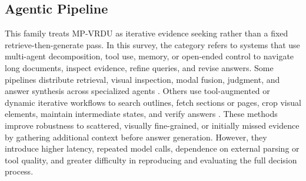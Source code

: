 \documentclass[11pt]{article}
\begin{document}

\subsection{Agentic Pipeline}
This family treats MP-VRDU as iterative evidence seeking rather than a fixed retrieve-then-generate pass. In this survey, the category refers to systems that use multi-agent decomposition, tool use, memory, or open-ended control to navigate long documents, inspect evidence, refine queries, and revise answers. Some pipelines distribute retrieval, visual inspection, modal fusion, judgment, and answer synthesis across specialized agents \cite{han2025mdocagent, duan2025m2rag, yu2025visual}. Others use tool-augmented or dynamic iterative workflows to search outlines, fetch sections or pages, crop visual elements, maintain intermediate states, and verify answers \cite{sun2025docagent, zhu2025doclens, zheng2026doc, wang2025vidorag}. These methods improve robustness to scattered, visually fine-grained, or initially missed evidence by gathering additional context before answer generation. However, they introduce higher latency, repeated model calls, dependence on external parsing or tool quality, and greater difficulty in reproducing and evaluating the full decision process.
\end{document}
